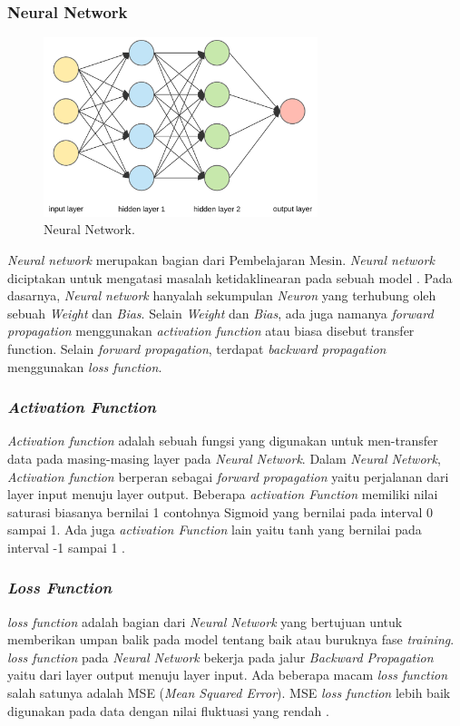 \subsubsection{Neural Network}
\label{sec:nn}
\begin{figure}[ht]
    \centering
  
    \includegraphics[width=8cm]{gambar/nn.png}
  
    \caption{Neural Network.}
    \label{fig:nn}
\end{figure}
\emph{Neural network} merupakan bagian dari Pembelajaran Mesin. 
\emph{Neural network} diciptakan untuk mengatasi masalah ketidaklinearan 
pada sebuah model \citet{ref_neural_network}. Pada dasarnya, 
\emph{Neural network} hanyalah sekumpulan \emph{Neuron} 
yang terhubung oleh sebuah \emph{Weight} dan \emph{Bias}. Selain 
\emph{Weight} dan \emph{Bias}, ada juga namanya \emph{forward propagation} 
menggunakan \emph{activation function} atau 
biasa disebut transfer function. Selain \emph{forward propagation},
 terdapat \emph{backward propagation} menggunakan \emph{loss function}. 

\subsubsection{\emph{Activation Function}}
\emph{Activation function} adalah sebuah fungsi yang digunakan untuk men-transfer 
data pada masing-masing layer pada \emph{Neural Network}. 
Dalam \emph{Neural Network}, \emph{Activation function} berperan sebagai 
\emph{forward propagation} yaitu perjalanan dari layer input menuju 
layer output. Beberapa \emph{activation Function} memiliki nilai 
saturasi biasanya bernilai 1 contohnya Sigmoid yang bernilai 
pada interval 0 sampai 1. Ada juga \emph{activation Function} lain yaitu 
tanh yang bernilai pada interval -1 sampai 1 \citet{ref_activation_function}.

\subsubsection{\emph{Loss Function}}
\emph{loss function} adalah bagian dari \emph{Neural Network} 
yang bertujuan untuk memberikan umpan balik 
pada model tentang baik atau buruknya fase \emph{training}. 
\emph{loss function} pada \emph{Neural Network} bekerja pada jalur 
\emph{Backward Propagation} yaitu dari layer output menuju layer input. 
Ada beberapa macam \emph{loss function} salah satunya adalah MSE 
(\emph{Mean Squared Error}). MSE \emph{loss function} lebih baik digunakan pada 
data dengan nilai fluktuasi yang rendah \citet{ref_loss_function}. 

